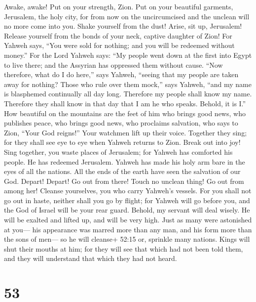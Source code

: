  Awake, awake! Put on your strength, Zion. Put on your
beautiful garments, Jerusalem, the holy city, for from now on the
uncircumcised and the unclean will no more come into you. 
Shake yourself from the dust! Arise, sit up, Jerusalem! Release yourself
from the bonds of your neck, captive daughter of Zion!  For
Yahweh says, ``You were sold for nothing; and you will be redeemed
without money.''  For the Lord Yahweh says: ``My people went
down at the first into Egypt to live there; and the Assyrian has
oppressed them without cause.  ``Now therefore, what do I do
here,'' says Yahweh, ``seeing that my people are taken away for nothing?
Those who rule over them mock,'' says Yahweh, ``and my name is
blasphemed continually all day long.  Therefore my people
shall know my name. Therefore they shall know in that day that I am he
who speaks. Behold, it is I.''  How beautiful on the
mountains are the feet of him who brings good news, who publishes peace,
who brings good news, who proclaims salvation, who says to Zion, ``Your
God reigns!''  Your watchmen lift up their voice. Together
they sing; for they shall see eye to eye when Yahweh returns to Zion.
 Break out into joy! Sing together, you waste places of
Jerusalem; for Yahweh has comforted his people. He has redeemed
Jerusalem.  Yahweh has made his holy arm bare in the eyes
of all the nations. All the ends of the earth have seen the salvation of
our God.  Depart! Depart! Go out from there! Touch no
unclean thing! Go out from among her! Cleanse yourselves, you who carry
Yahweh's vessels.  For you shall not go out in haste,
neither shall you go by flight; for Yahweh will go before you, and the
God of Israel will be your rear guard.  Behold, my servant
will deal wisely. He will be exalted and lifted up, and will be very
high.  Just as many were astonished at you--- his
appearance was marred more than any man, and his form more than the sons
of men---  so he will cleanse+ 52:15 or, sprinkle many
nations. Kings will shut their mouths at him; for they will see that
which had not been told them, and they will understand that which they
had not heard.

\hypertarget{section-49}{%
\section{53}\label{section-49}}

